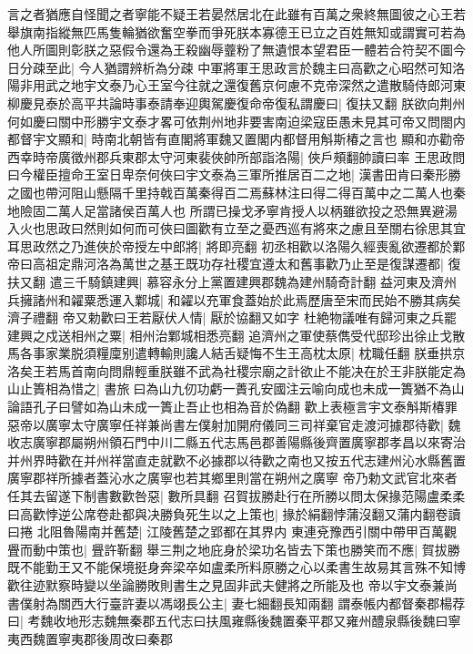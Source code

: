 言之者猶應自怪聞之者寧能不疑王若晏然居北在此雖有百萬之衆終無圖彼之心王若舉旗南指縱無匹馬隻輪猶欲奮空拳而爭死朕本寡德王已立之百姓無知或謂實可若為他人所圖則彰朕之惡假令還為王殺幽辱虀粉了無遺恨本望君臣一體若合符契不圖今日分疎至此|{
	今人猶謂辨析為分疎}
中軍將軍王思政言於魏主曰高歡之心昭然可知洛陽非用武之地宇文泰乃心王室今往就之還復舊京何慮不克帝深然之遣散騎侍郎河東柳慶見泰於高平共論時事泰請奉迎輿駕慶復命帝復私謂慶曰|{
	復扶又翻}
朕欲向荆州何如慶曰關中形勝宇文泰才畧可依荆州地非要害南迫梁寇臣愚未見其可帝又問閤内都督宇文顯和|{
	時南北朝皆有直閣將軍魏又置閣内都督用斛斯椿之言也}
顯和亦勸帝西幸時帝廣徵州郡兵東郡太守河東裴俠帥所部詣洛陽|{
	俠戶頰翻帥讀曰率}
王思政問曰今權臣擅命王室日卑奈何俠曰宇文泰為三軍所推居百二之地|{
	漢書田肯曰秦形勝之國也帶河阻山懸隔千里持戟百萬秦得百二焉蘇林注曰得二得百萬中之二萬人也秦地險固二萬人足當諸侯百萬人也}
所謂已操戈矛寧肯授人以柄雖欲投之恐無異避湯入火也思政曰然則如何而可俠曰圖歡有立至之憂西巡有將來之慮且至關右徐思其宜耳思政然之乃進俠於帝授左中郎將|{
	將即亮翻}
初丞相歡以洛陽久經喪亂欲遷都於鄴帝曰高祖定鼎河洛為萬世之基王既功存社稷宜遵太和舊事歡乃止至是復謀遷都|{
	復扶又翻}
遣三千騎鎮建興|{
	慕容永分上黨置建興郡魏為建州騎奇計翻}
益河東及濟州兵擁諸州和糴粟悉運入鄴城|{
	和糴以充軍食蓋始於此焉歷唐至宋而民始不勝其病矣濟子禮翻}
帝又勅歡曰王若厭伏人情|{
	厭於協翻又如字}
杜絶物議唯有歸河東之兵罷建興之戍送相州之粟|{
	相州治鄴城相悉亮翻}
追濟州之軍使蔡儁受代邸珍出徐止戈散馬各事家業脱須糧廩别遣轉輸則讒人結舌疑悔不生王高枕太原|{
	枕職任翻}
朕垂拱京洛矣王若馬首南向問鼎輕重朕雖不武為社稷宗廟之計欲止不能决在於王非朕能定為山止簣相為惜之|{
	書旅曰為山九仞功虧一蕢孔安國注云喻向成也未成一簣猶不為山論語孔子曰譬如為山未成一簣止吾止也相為音於偽翻}
歡上表極言宇文泰斛斯椿罪惡帝以廣寧太守廣寧任祥兼尚書左僕射加開府儀同三司祥棄官走渡河據郡待歡|{
	魏收志廣寧郡屬朔州領石門中川二縣五代志馬邑郡善陽縣後齊置廣寧郡孝昌以來寄治并州界時歡在并州祥當直走就歡不必據郡以待歡之南也又按五代志建州沁水縣舊置廣寧郡祥所據者蓋沁水之廣寧也若其鄉里則當在朔州之廣寧}
帝乃勅文武官北來者任其去留遂下制書數歡咎惡|{
	數所具翻}
召賀拔勝赴行在所勝以問太保掾范陽盧柔柔曰高歡悖逆公席卷赴都與决勝負死生以之上策也|{
	掾於絹翻悖蒲沒翻又蒲内翻卷讀曰捲}
北阻魯陽南并舊楚|{
	江陵舊楚之郢都在其界内}
東連兗豫西引關中帶甲百萬觀舋而動中策也|{
	舋許靳翻}
舉三荆之地庇身於梁功名皆去下策也勝笑而不應|{
	賀拔勝既不能勤王又不能保境挺身奔梁卒如盧柔所料原勝之心以柔書生故易其言殊不知博歡往迹默察時變以坐論勝敗則書生之見固非武夫健將之所能及也}
帝以宇文泰兼尚書僕射為關西大行臺許妻以馮翊長公主|{
	妻七細翻長知兩翻}
謂泰帳内都督秦郡楊荐曰|{
	考魏收地形志魏無秦郡五代志曰扶風雍縣後魏置秦平郡又雍州醴泉縣後魏曰寧夷西魏置寧夷郡後周改曰秦郡}
